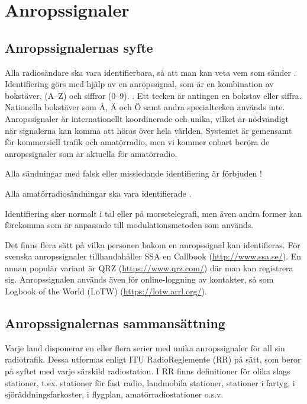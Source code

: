 \section{Anropssignaler}

\subsection{Anropssignalernas syfte}

Alla radiosändare ska vara identifierbara, så att man kan veta vem
som sänder \cite[\S19.1]{ITU-RR}.
Identifiering görs med hjälp av en anropssignal, som är en kombination av bokstäver, (A--Z) och siffror (0--9). \cite[\S19.45]{ITU-RR}.
Ett tecken är antingen en bokstav eller siffra. Nationella bokstäver som Å, Ä och Ö samt andra specialtecken används inte.
Anropssignaler är internationellt koordinerade och unika, vilket är nödvändigt
när signalerna kan komma att höras över hela världen.
Systemet är gemensamt för kommersiell trafik och amatörradio, men vi kommer
enbart beröra de anropssignaler som är aktuella för amatörradio.

Alla sändningar med falsk eller missledande identifiering är förbjuden
\cite[\S19.2]{ITU-RR}!

Alla amatörradiosändningar ska vara identifierade \cite[\S19.4, \S19.5]{ITU-RR}.

Identifiering sker normalt i tal eller på morsetelegrafi, men även andra former
kan förekomma som är anpassade till modulationsmetoden som används.

Det finns flera sätt på vilka personen bakom en anropssignal kan identifieras.
För svenska anropssignaler tillhandahåller SSA en Callbook
(\url{http://www.ssa.se/}).
En annan populär variant är QRZ (\url{https://www.qrz.com/}) där man kan
registrera sig.
Anropssignalen används även för online-loggning av kontakter, så som
Logbook of the World (LoTW) (\url{https://lotw.arrl.org/}).

\subsection{Anropssignalernas sammansättning}

Varje land disponerar en eller flera serier med unika anropssignaler för all sin radiotrafik.
Dessa utformas enligt ITU RadioReglemente (RR) \cite[\S19]{ITU-RR} på sätt,
som beror på syftet med varje särskild radiostation.
I RR finns definitioner för olika slags stationer, t.ex. stationer för fast
radio, landmobila stationer, stationer i fartyg, i sjöräddningsfarkoster,
i flygplan, amatörradiostationer o.s.v.

